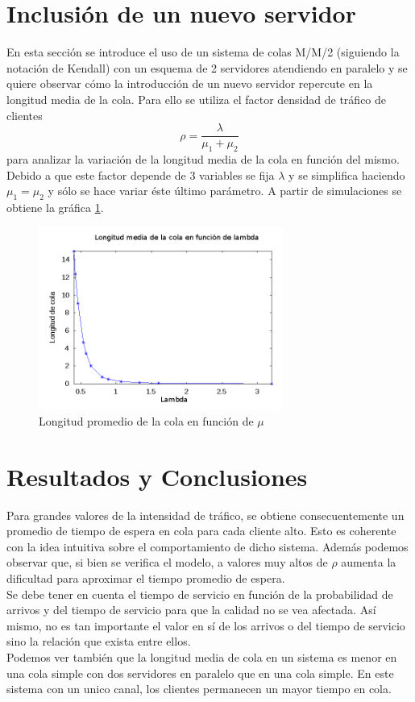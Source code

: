 \documentclass{sig-alternate}
\begin{document}
\section{Inclusi\'on de un nuevo servidor}
\label{sec:mm2}

En esta secci\'on se introduce el uso de un sistema de colas M/M/2 (siguiendo la notaci\'on de Kendall)
con un esquema de 2 servidores atendiendo en paralelo y se quiere observar c\'omo la introducci\'on
de un nuevo servidor repercute en la longitud media de la cola. Para ello se utiliza el factor densidad de tr\'afico de clientes
\begin{equation}
\rho = \frac{\lambda}{\mu_{1} + \mu_{2}}
\end{equation}
para analizar la variaci\'on de la longitud media de la cola en funci\'on del mismo.
Debido a que este factor depende de 3 variables se fija $\lambda$ y se simplifica haciendo
$\mu_{1}=\mu_{2}$ y s\'olo se hace variar \'este \'ultimo par\'ametro.
A partir de simulaciones se obtiene la gr\'afica \ref{fig:mu}.

\begin{figure}[ht]
\begin{center}
\includegraphics[width=8cm]{mm2-mu}
\caption{\label{fig:mu} Longitud promedio de la cola en funci\'on de $\mu$}
\end{center}
\end{figure}

\section{Resultados y Conclusiones}
\label{sec:conclusiones}
Para grandes valores de la intensidad de tráfico, se obtiene consecuentemente un promedio de tiempo de espera en cola para cada cliente alto.
Esto es coherente con la idea intuitiva sobre el comportamiento de dicho sistema. Además podemos observar que, si bien se verifica el modelo,
a valores muy altos de $\rho$ aumenta la dificultad para aproximar el tiempo promedio de espera.\\
Se debe tener en cuenta el tiempo de servicio en función de la probabilidad de arrivos y del tiempo de servicio para que la calidad no se vea afectada.
Así mismo, no es tan importante el valor en sí de los arrivos o del tiempo de servicio sino la relación que exista entre ellos.\\
Podemos ver tambi\'en que la longitud media de cola en un sistema es menor en una cola simple con dos servidores en paralelo que en una cola simple. 
En este sistema con un unico canal, los clientes permanecen un mayor tiempo en cola.
\end{document}
